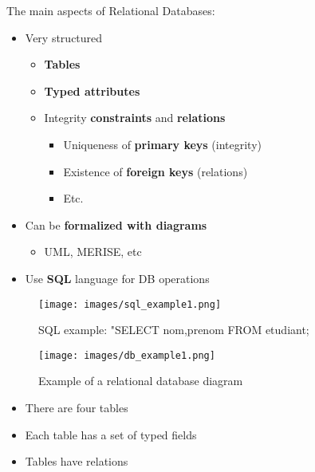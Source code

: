 \documentclass{beamer}[10pt, usepdftitle=false handout]
\begin{document}
    \begin{frame}[label=(first)]
	The main aspects of Relational Databases:
	\vspace*{0.6em}
	
	\begin{itemize}
		\item{Very structured
			\begin{itemize}
				\item{\textbf{Tables}}
				\item{\textbf{Typed attributes}}
				\item{Integrity \textbf{constraints} and \textbf{relations}
					\begin{itemize}
						\item{Uniqueness of \textbf{primary keys} (integrity)}
						\item{Existence of \textbf{foreign keys} (relations)}
						\item{Etc.}
					\end{itemize}					
				}				
			\end{itemize}					
		}
		\item{Can be \textbf{formalized with diagrams}
			\begin{itemize}
				\item{UML, MERISE, etc}
			\end{itemize}					
		}		
		\item{Use \textbf{SQL} language for DB operations}	
	\end{itemize}

	\begin{figure}
	\texttt{[image: images/sql\_example1.png]} 
     	\vspace*{-0.5em}
		\caption{SQL example: "SELECT nom,prenom FROM etudiant;}
	\end{figure}
	
	
	\end{frame}

	\begin{frame}
	
	\begin{figure}
	\texttt{[image: images/db\_example1.png]} 
     	\vspace*{-0.5em}
		\caption{Example of a relational database diagram}
	\end{figure}
	
	\vspace*{0.6em}	
	
	\begin{itemize}
	\item{There are four tables}
	\item{Each table has a set of typed fields}
	\item{Tables have relations}	
	\end{itemize}		
		
	\end{frame}
	
\end{document}
